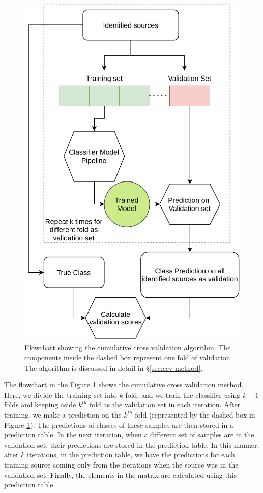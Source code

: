 \documentclass[fleqn,usenatbib]{mnras}
\begin{document}
    \begin{figure}
        \centering
        \includegraphics[width=\columnwidth]{images/validation_flowchart.pdf}
        \caption{Flowchart showing the cumulative cross validation algorithm. The components inside the dashed box represent one fold of validation. The algorithm is discussed in detail in \S \ref{sec:ccv-method}.}
        \label{fig:ccv-method}
    \end{figure}
     
    The flowchart in the Figure \ref{fig:ccv-method} shows the cumulative cross validation method. Here, we divide the training set into $k$-fold, and we train the classifier using $k-1$ folds and keeping aside $k^{th}$ fold as the validation set in each iteration. After training, we make a prediction on the $k^{th}$ fold (represented by the dashed box in Figure \ref{fig:ccv-method}). The predictions of classes of these samples are then stored in a prediction table. In the next iteration, when a different set of samples are in the validation set, their predictions are stored in the prediction table. In this manner, after $k$ iterations, in the prediction table, we have the predictions for each training source coming only from the iterations when the source was in the validation set. Finally, the elements in the matrix are calculated using this prediction table.
    
\end{document}

